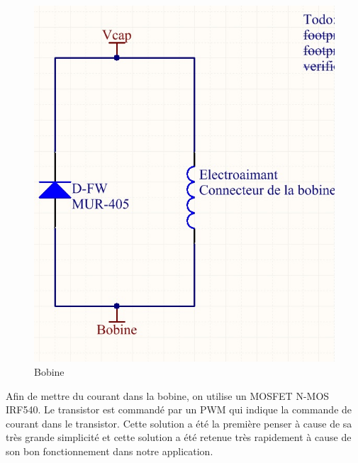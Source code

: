   \begin{figure}[H]
    \label{Bobine}
    \centering
    \includegraphics[scale=0.3]{resources/bobine.jpg}
    \caption{Bobine}
  \end{figure}

Afin de mettre du courant dans la bobine, on utilise un MOSFET N-MOS IRF540. Le transistor est commandé par un PWM qui indique la commande de courant dans le transistor. Cette solution a été la première penser à cause de sa très grande simplicité et cette solution a été retenue très rapidement à cause de son bon fonctionnement dans notre application.

